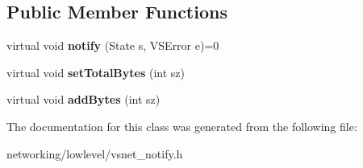 \subsection*{Public Member Functions}
\begin{DoxyCompactItemize}
\item 
virtual void {\bfseries notify} (State s, V\+S\+Error e)=0\hypertarget{classVsnetDownload_1_1Client_1_1Notify_a0496c07234a99dc9ff8f9af5b6d37484}{}\label{classVsnetDownload_1_1Client_1_1Notify_a0496c07234a99dc9ff8f9af5b6d37484}

\item 
virtual void {\bfseries set\+Total\+Bytes} (int sz)\hypertarget{classVsnetDownload_1_1Client_1_1Notify_a95b368ca96ffe1a8c3ae57bb61ba9ef0}{}\label{classVsnetDownload_1_1Client_1_1Notify_a95b368ca96ffe1a8c3ae57bb61ba9ef0}

\item 
virtual void {\bfseries add\+Bytes} (int sz)\hypertarget{classVsnetDownload_1_1Client_1_1Notify_a221fb304805e3d3f2d6c522b6eacbc43}{}\label{classVsnetDownload_1_1Client_1_1Notify_a221fb304805e3d3f2d6c522b6eacbc43}

\end{DoxyCompactItemize}


The documentation for this class was generated from the following file\+:\begin{DoxyCompactItemize}
\item 
networking/lowlevel/vsnet\+\_\+notify.\+h\end{DoxyCompactItemize}
